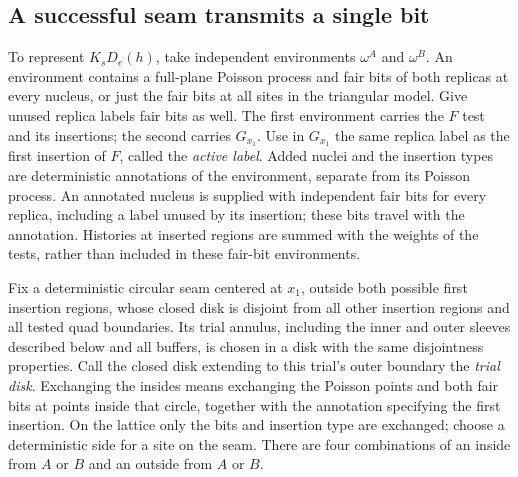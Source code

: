 \subsection{A successful seam transmits a single bit}

To represent $K_sD_e(h)$, take independent environments $\omega^A$ and
$\omega^B$.  An environment contains a full-plane Poisson process and fair
bits of both replicas at every nucleus, or just the fair bits at all sites
in the triangular model.  Give unused replica labels fair bits as well.
The first environment carries the $F$ test and its insertions; the second
carries $G_{x_1}$.  Use in $G_{x_1}$ the same replica label as the first
insertion of $F$, called the \emph{active label}.  Added nuclei and the
insertion types are deterministic annotations of the environment, separate
from its Poisson process.  An annotated nucleus is supplied with independent
fair bits for every replica, including a label unused by its insertion;
these bits travel with the annotation.  Histories at inserted regions are summed
with the weights of the tests, rather than included in these fair-bit
environments.

Fix a deterministic circular seam centered at $x_1$, outside both possible
first insertion regions, whose closed disk is disjoint from all other
insertion regions and all tested quad boundaries.  Its trial annulus,
including the inner and outer sleeves described below and all buffers,
is chosen in a disk with the same disjointness properties.  Call the
closed disk extending to this trial's outer boundary the \emph{trial disk}.
Exchanging the insides means exchanging the
Poisson points and both fair bits at points inside that circle, together
with the annotation specifying the first insertion.  On the lattice only
the bits and insertion type are exchanged; choose a deterministic side
for a site on the seam.  There are four combinations of an inside from
$A$ or $B$ and an outside from $A$ or $B$.

